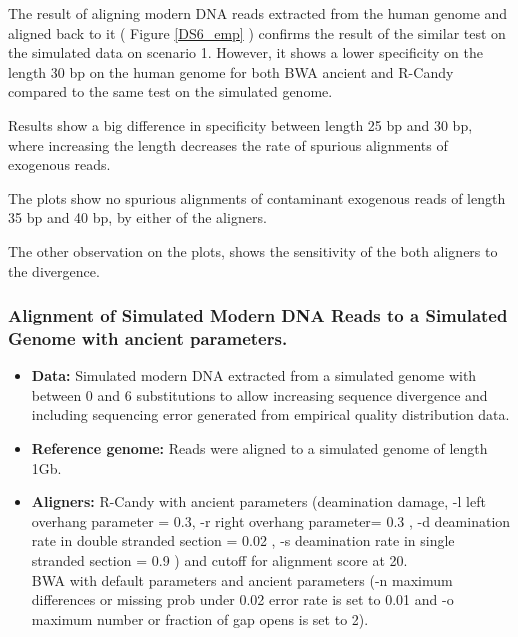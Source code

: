 \documentclass[11pt,a4paper]{report}
\begin{document}
The result of aligning modern DNA reads extracted from the human genome and 
aligned back to it ( Figure \ref{DS6_emp} ) confirms the result of the similar 
test on the simulated data on scenario 1.  However, it shows a lower specificity 
on the length 30 bp on the human genome for both BWA ancient and R-Candy compared
to the same test on the simulated genome.

Results show a big difference in specificity between length 25 bp and 30 bp, 
where increasing the length decreases the rate of spurious alignments of exogenous
reads.

The plots show no spurious alignments of contaminant exogenous reads of length 
35 bp and 40 bp, by either of the aligners.

The other observation on the plots, shows the sensitivity of the both aligners
to the divergence.




 \subsubsection {Alignment of Simulated Modern DNA Reads to a Simulated Genome 
 with ancient parameters.}

 \label {Alignment of Simulated Modern DNA Reads to a Simulated Genome with
 ancient parameters.}
 

  \begin{itemize}

   \item \textbf{Data:} Simulated modern DNA extracted from a simulated genome 
   with between 0 and 6 substitutions to allow increasing sequence divergence
   and including sequencing error generated from empirical quality distribution 
   data.
 
   
   \item \textbf{Reference genome:} Reads were aligned to a simulated genome of 
   length 1Gb.

    \item \textbf{Aligners:}
    R-Candy with ancient parameters (deamination damage, -l left overhang 
    parameter = 0.3, -r right overhang parameter= 0.3 , -d deamination rate 
    in double stranded section = 0.02 , -s deamination rate in single stranded 
    section = 0.9 ) and cutoff for alignment score at 20. \\
    BWA with default parameters and ancient parameters 
    (-n maximum differences or missing prob under 0.02 error rate is set to 0.01 
     and -o maximum number or fraction of gap opens is set to 2)\cite{green2010draft}.

   
   \end{itemize}
 
\end{document}
